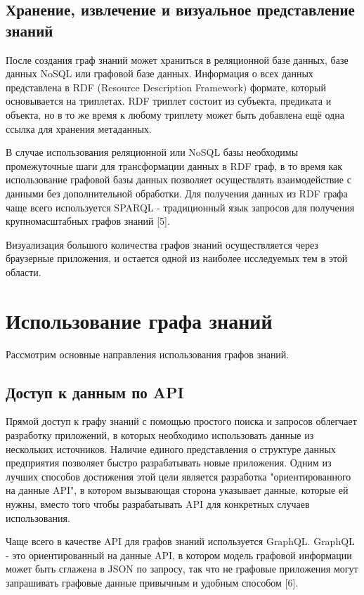 \subsection{Хранение, извлечение и визуальное представление знаний}

После создания граф знаний может храниться в реляционной базе данных, базе данных NoSQL или графовой базе данных. Информация о всех данных
представлена в RDF (Resource Description Framework) формате, который основывается на триплетах. RDF триплет состоит из субъекта, предиката и
объекта, но в то же время к любому триплету может быть добавлена ещё одна ссылка для хранения метаданных.

В случае использования реляционной или NoSQL базы необходимы промежуточные шаги для трансформации данных в RDF граф, в то время как
использование графовой базы данных позволяет осуществлять взаимодействие с данными без дополнительной обработки. Для получения данных из RDF
графа чаще всего используется SPARQL - традиционный язык запросов для получения крупномасштабных графов знаний [5].

Визуализация большого количества графов знаний осуществляется через браузерные приложения, и остается одной из наиболее исследуемых тем в этой области.


\section{Использование графа знаний}

Рассмотрим основные направления использования графов знаний.

\subsection{Доступ к данным по API}

Прямой доступ к графу знаний с помощью простого поиска и запросов облегчает разработку приложений, в которых необходимо использовать данные
из нескольких источников. Наличие единого представления о структуре данных предприятия позволяет быстро разрабатывать новые приложения.
Одним из лучших способов достижения этой цели является разработка "ориентированного на данные API", в котором вызывающая сторона указывает
данные, которые ей нужны, вместо того чтобы разрабатывать API для конкретных случаев использования.

Чаще всего в качестве API для графов знаний используется GraphQL. GraphQL - это ориентированный на данные API, в котором модель графовой
информации может быть сглажена в JSON по запросу, так что не графовые приложения могут запрашивать графовые данные привычным и удобным способом [6].

